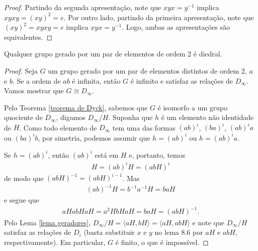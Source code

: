 	\begin{proof}
		Partindo da segunda apresentação, note que $xyx=y^{-1}$ implica $xyxy=(xy)^2=e$. Por outro lado, 
		partindo da primeira apresentação, note que $(xy)^2=xyxy=e$ implica $xyx=y^{-1}$. Logo, 
		ambas as apresentações são equivalentes.
	\end{proof}
	\begin{theorem}
		Qualquer grupo gerado por um par de elementos de ordem 2 é diedral. 
	\end{theorem}
	\begin{proof}
		Seja $G$ um grupo gerado por um par de elementos distintos de ordem 2, $a$ e $b$. 
		Se a ordem de $ab$ é infinita, então $G$ é infinito e satisfaz as relações de $D_{\infty}$. 
		Vamos mostrar que $G\cong D_{\infty}$. 
		
		\par\vspace{0.3cm} Pelo Teorema \ref{teorema de Dyck}, sabemos que $G$ é isomorfo a um 
		grupo quociente de $D_{\infty}$, digamos $D_{\infty}/H$. Suponha que $h$ é um elemento não 
		identidade de $H$. Como todo elemento de $D_{\infty}$ tem uma das formas 
		$(ab)^i$, $(ba)^i$, $(ab)^ia$ ou $(ba)^ib$, por simetria, podemos assumir que 
		$h = (ab)^i$ ou $h = (ab)^ia$.
		
		\par\vspace{0.3cm} Se $h = (ab)^i$, então $(ab)^i$ está em $H$ e, portanto, temos
		\begin{align*}
		    H = (ab)^iH = (abH)^i
		\end{align*}
		de modo que $(abH)^{-1} = (abH)^{i-1}$. Mas
		\begin{align*}
		    (ab)^{-1}H = b^{-1}a^{-1}H = baH
		\end{align*}
		e segue que
		\begin{align*}
		    aHabHaH = a^2HbHaH = baH = (abH)^{-1}.
		\end{align*}
		Pelo Lema \ref{lema geradores}, $D_{\infty}/H = \langle aH, bH \rangle 
		= \langle aH, abH \rangle$ e note que $D_{\infty}/H$ satisfaz as relações de $D_i$ 
		(basta substituir $x$ e $y$ no lema 8.6 por $aH$ e $abH$, respectivamente). Em particular, 
		$G$ é finito, o que é impossível.
		

\end{proof}
